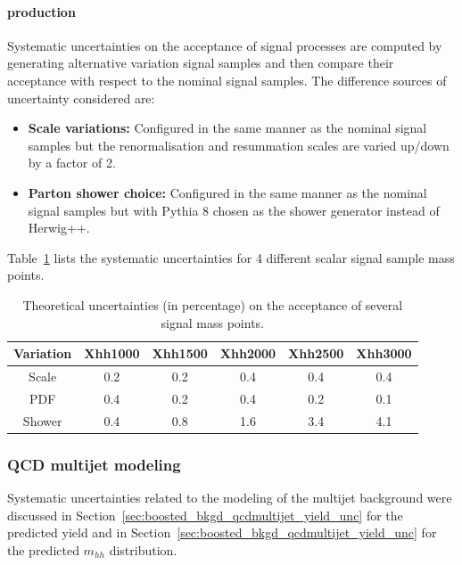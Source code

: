 \paragraph{production}
\label{sec:boosted_syst_modeling_signal}
Systematic uncertainties on the acceptance of signal processes are computed by generating alternative variation signal samples
and then compare their acceptance with respect to the nominal signal samples. The difference sources of uncertainty considered are:
 
\begin{itemize}
\item \textbf{Scale variations:} Configured in the same manner as the nominal signal samples but
the renormalisation and resummation scales are varied up/down by a factor of 2.
 
 
\item \textbf{Parton shower choice:} Configured in the same manner as the nominal signal samples but
with Pythia 8 chosen as the shower generator instead of Herwig++.
\end{itemize}
 
Table~\ref{tab:boosted_unc_signal} lists the systematic uncertainties for 4 different scalar signal sample
mass points.
 
\begin{table}[htbp!]
\begin{center}
\begin{tabular}{c|c|c|c|c|c}
Variation    &  Xhh1000  &  Xhh1500 & Xhh2000 & Xhh2500 & Xhh3000   \\
\hline
Scale        &    0.2    &    0.2   &  0.4    &  0.4   &  0.4  \\
PDF          &    0.4    &    0.2   &  0.4    &  0.2   &  0.1  \\
Shower       &    0.4    &    0.8   &  1.6    &  3.4   &  4.1  \\
\end{tabular}
\end{center}
\caption{Theoretical uncertainties (in percentage) on the acceptance of several signal mass points.}
\label{tab:boosted_unc_signal}
 
 
\end{table}
\subsubsection{QCD multijet modeling}
\label{sec:boosted_syst_modeling_multijet}
 
Systematic uncertainties related to the modeling of the multijet background were discussed in Section~\ref{sec:boosted_bkgd_qcdmultijet_yield_unc}
for the predicted yield and in Section~\ref{sec:boosted_bkgd_qcdmultijet_yield_unc} for the predicted $m_{hh}$ distribution.